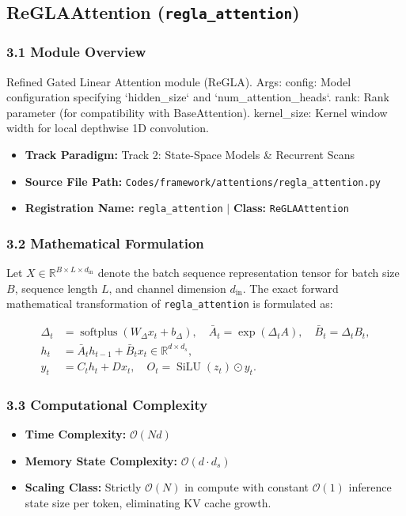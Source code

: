 \subsection{ReGLAAttention (\texttt{regla\_attention})}
\label{sec:app_module_regla_attention}

\subsubsection*{3.1 Module Overview}
Refined Gated Linear Attention module (ReGLA).  Args:     config: Model configuration specifying `hidden\_size` and `num\_attention\_heads`.     rank: Rank parameter (for compatibility with BaseAttention).     kernel\_size: Kernel window width for local depthwise 1D convolution.
\begin{itemize}
    \item \textbf{Track Paradigm:} Track 2: State-Space Models & Recurrent Scans
    \item \textbf{Source File Path:} \texttt{Codes/framework/attentions/regla\_attention.py}
    \item \textbf{Registration Name:} \texttt{regla\_attention} $\mid$ \textbf{Class:} \texttt{ReGLAAttention}
\end{itemize}

\subsubsection*{3.2 Mathematical Formulation}
Let $X \in \mathbb{R}^{B \times L \times d_{\text{in}}}$ denote the batch sequence representation tensor for batch size $B$, sequence length $L$, and channel dimension $d_{\text{in}}$. The exact forward mathematical transformation of \texttt{regla\_attention} is formulated as:

\begin{align}
\Delta_t &= \operatorname{softplus}(W_\Delta x_t + b_\Delta), \quad \bar{A}_t = \exp(\Delta_t A), \quad \bar{B}_t = \Delta_t B_t, \\
h_t &= \bar{A}_t h_{t-1} + \bar{B}_t x_t \in \mathbb{R}^{d \times d_s}, \\
y_t &= C_t h_t + D x_t, \quad O_t = \operatorname{SiLU}(z_t) \odot y_t.
\end{align}


\subsubsection*{3.3 Computational Complexity}
\begin{itemize}
    \item \textbf{Time Complexity:} $\mathcal{O}(N d)$
    \item \textbf{Memory State Complexity:} $\mathcal{O}(d \cdot d_s)$
    \item \textbf{Scaling Class:} Strictly $\mathcal{O}(N)$ in compute with constant $\mathcal{O}(1)$ inference state size per token, eliminating KV cache growth.
\end{itemize}

